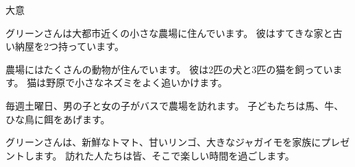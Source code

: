 \documentclass[aspectratio=169,xcolor={dvipsnames,table}]{beamer}
\begin{document}
\begin{frame}[plain]{大意}
  \begin{tcolorbox}[title=小さな農場での暮らし]\zw

    グリーンさんは大都市近くの小さな農場に住んでいます。
    彼はすてきな家と古い納屋を2つ持っています。

    農場にはたくさんの動物が住んでいます。
    彼は2匹の犬と3匹の猫を飼っています。
    猫は野原で小さなネズミをよく追いかけます。

    毎週土曜日、男の子と女の子がバスで農場を訪れます。
    子どもたちは馬、牛、ひな鳥に餌をあげます。

    グリーンさんは、新鮮なトマト、甘いリンゴ、大きなジャガイモを家族にプレゼントします。
    訪れた人たちは皆、そこで楽しい時間を過ごします。
  \end{tcolorbox}



\end{frame}
\end{document}
